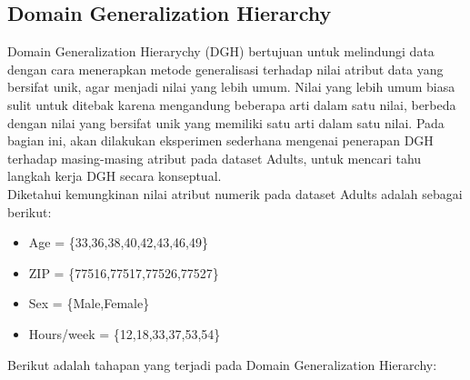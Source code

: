 \subsection{Domain Generalization Hierarchy}
Domain Generalization Hierarychy (DGH) bertujuan untuk melindungi data dengan cara menerapkan metode generalisasi terhadap nilai atribut data yang bersifat unik, agar menjadi nilai yang lebih umum. Nilai yang lebih umum biasa sulit untuk ditebak karena mengandung beberapa arti dalam satu nilai, berbeda dengan nilai yang bersifat unik yang memiliki satu arti dalam satu nilai. Pada bagian ini, akan dilakukan eksperimen sederhana mengenai penerapan DGH terhadap masing-masing atribut pada dataset Adults, untuk mencari tahu langkah kerja DGH secara konseptual. \\

\noindent Diketahui kemungkinan nilai atribut numerik pada dataset Adults adalah sebagai berikut:

\begin{itemize}
\item Age = \{33,36,38,40,42,43,46,49\}
\item ZIP = \{77516,77517,77526,77527\}
\item Sex = \{Male,Female\}
\item Hours/week = \{12,18,33,37,53,54\}
\end{itemize}

\noindent Berikut adalah tahapan yang terjadi pada Domain Generalization Hierarchy:

